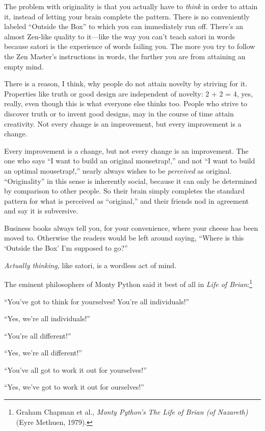 {
 The problem with originality is that you actually have to
\textit{think} in order to attain it, instead of letting your brain
complete the pattern. There is no conveniently labeled
``Outside the Box'' to which you can
immediately run off. There's an almost Zen-like quality
to it---like the way you can't teach satori in words
because satori is the experience of words failing you. The more you try
to follow the Zen Master's instructions in words, the
further you are from attaining an empty mind.}

{
 There is a reason, I think, why people do not attain novelty by
striving for it. Properties like truth or good design are independent
of novelty: 2 + 2 = 4, yes, really, even though this is what everyone
else thinks too. People who strive to discover truth or to invent good
designs, may in the course of time attain creativity. Not every change
is an improvement, but every improvement is a change.}

{
 Every improvement is a change, but not every change is an
improvement. The one who says ``I want to build an
original mousetrap!,'' and not ``I
want to build an optimal mousetrap!,'' nearly always
wishes to be \textit{perceived} as original.
``Originality'' in this sense is
inherently social, because it can only be determined by comparison to
other people. So their brain simply completes the standard pattern for
what is perceived as ``original,''
and their friends nod in agreement and say it is subversive.}

{
 Business books always tell you, for your convenience, where your
cheese has been moved to. Otherwise the readers would be left around
saying, ``Where is this `Outside the
Box' I'm supposed to
go?''}

{
 \textit{Actually thinking,} like satori, is a wordless act of
mind.}

{
 The eminent philosophers of Monty Python said it best of all in
\textit{Life of Brian}:\footnote{Graham Chapman et al., \textit{Monty Python's
The Life of Brian (of Nazareth)} (Eyre Methuen, 1979).}}

{
 ``You've got to think for
yourselves! You're all
individuals!''}

{
 ``Yes, we're all
individuals!''}

{
 ``You're all
different!''}

{
 ``Yes, we're all
different!''}

{
 ``You've all got to work it out
for yourselves!''}

{
 ``Yes, we've got to work it out
for ourselves!''}

